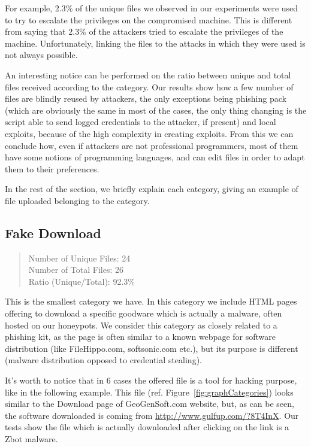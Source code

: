 For example, 2.3\% of the unique files we observed in our experiments were used to try to escalate the privileges on the compromised machine. This is different from saying that 2.3\% of the attackers tried to escalate the privileges of the machine. Unfortunately, linking the files to the attacks in which they were used is not always possible.

An interesting notice can be performed on the ratio between unique and total files received according to the category. Our results show how a few number of files are blindly reused by attackers, the only exceptions being phishing pack (which are obviously the same in most of the cases, the only thing changing is the script able to send logged credentials to the attacker, if present) and local exploits, because of the high complexity in creating exploits. From this we can conclude how, even if attackers are not professional programmers, most of them have some notions of programming languages, and can edit files in order to adapt them to their preferences.

In the rest of the section, we briefly explain each category, giving an example of file uploaded belonging to the category.

\subsection{Fake Download}

\begin{quote}
Number of Unique Files: 24\\
Number of Total Files: 26\\
Ratio (Unique/Total): 92.3\%
\end{quote}

This is the smallest category we have. In this category we include HTML pages offering to download a specific goodware which is actually a malware, often hosted on our honeypots. We consider this category as closely related to a phishing kit, as the page is often similar to a known webpage for software distribution (like FileHippo.com, softsonic.com etc.), but its purpose is different (malware distribution opposed to credential stealing).

It's worth to notice that in 6 cases the offered file is a tool for hacking purpose, like in the following example.
This file (ref. Figure~\ref{fig:graphCategories}) looks similar to the Download page of GeoGenSoft.com website, but, as can be seen, the software downloaded is coming from \url{http://www.gulfup.com/?8T4InX}. Our tests show the file which is actually downloaded after clicking on the link is a Zbot malware.

